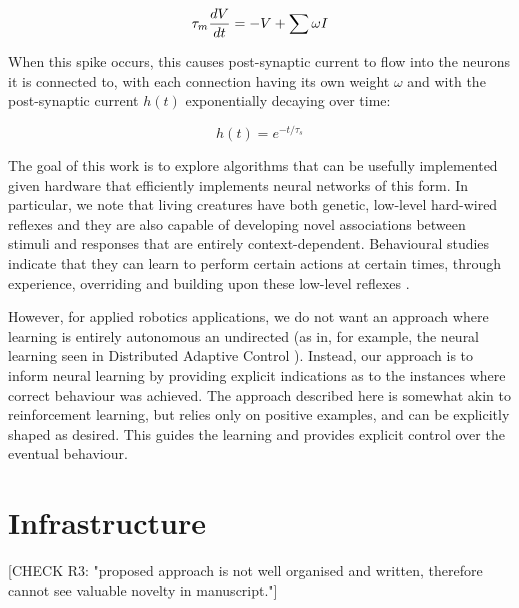 \documentclass[conference]{IEEEtran}
\begin{document}
\begin{equation}
    \tau_m {dV \over dt} = -V + \sum \omega I
\end{equation}

When this spike occurs, this causes post-synaptic current to flow into the 
neurons it is connected to, with each connection having its own weight $\omega$
and with the post-synaptic current $h(t)$ exponentially decaying over time:

\begin{equation}
    h(t) = e^{-t/\tau_s}
\end{equation}

The goal of this work is to explore algorithms that can be usefully implemented
given hardware that efficiently implements neural networks of this form.  In
particular, we note that living creatures have both genetic, low-level 
hard-wired reflexes and they are also capable of developing novel associations 
between stimuli and responses that are entirely context-dependent. Behavioural 
studies indicate that they can learn to perform certain actions at certain 
times, through experience, overriding and building upon these low-level 
reflexes \cite{kim2007encoding}. 

However, for applied robotics applications, we do not want an approach where
learning is entirely autonomous an undirected (as in, for example, the neural
learning seen in Distributed Adaptive Control \cite{verschure2012distributed}). 
Instead, our approach is to inform neural learning by providing explicit
indications as to the instances where correct behaviour was achieved.  The 
approach described here is somewhat akin to reinforcement learning, but relies
only on positive examples, and can be explicitly shaped as desired.  This 
guides the learning and provides explicit control over the eventual behaviour. 

\section{Infrastructure}
\label{infrastructure}

[CHECK R3: "proposed approach is not well organised and written, therefore cannot see valuable novelty in manuscript."]
\end{document}
